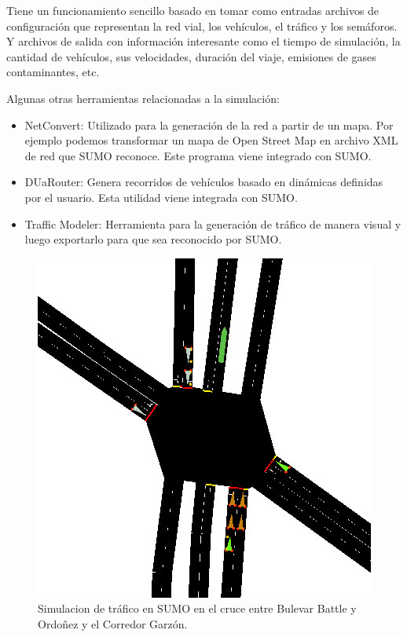 Tiene un funcionamiento sencillo basado en tomar como entradas archivos de configuración que representan la red vial, los vehículos, el tráfico y los semáforos. Y archivos de salida con información interesante como el tiempo de simulación, la cantidad de vehículos, sus velocidades, duración del viaje, emisiones de gases contaminantes, etc. 

Algunas otras herramientas relacionadas a la simulación:

\begin{itemize}
	
	\item  NetConvert: Utilizado para la generación de la red a partir de un mapa. Por ejemplo podemos transformar un mapa de Open Street Map en archivo XML de red que SUMO reconoce. Este programa viene integrado con SUMO.
	\item DUaRouter: Genera recorridos de vehículos basado en dinámicas definidas por el usuario. Esta utilidad viene integrada con SUMO.
	\item Traffic Modeler: Herramienta para la generación de tráfico de manera visual y luego exportarlo para que sea reconocido por SUMO. \citep{TrafficModeler}
	
	
\end{itemize}

\begin{figure}[h]
	\centering
	\includegraphics[width=0.7\linewidth]{Figures/sim1}
	\caption{Simulacion de tráfico en SUMO en el cruce entre Bulevar Battle y Ordoñez y el Corredor Garzón.}
	\label{fig:sim1}
\end{figure}



